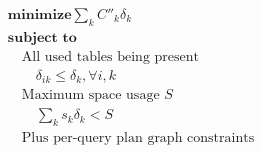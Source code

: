 \documentclass[preview,border=2pt]{standalone}
\begin{document}
\[
\renewcommand{\arraystretch}{1.2}
\begin{array}{l}
\displaystyle \textbf{minimize} \sum_k C''_k \delta_k \\
\textbf{subject to} \\
\quad \text{All used tables being present} \\
\qquad \delta_{ik} \leq \delta_k, \forall{i, k} \\
\quad \text{Maximum space usage } S \\
\displaystyle \qquad \sum_k s_k \delta_k < S \\
\quad \text{Plus per-query plan graph constraints}
\end{array}
\]
\end{document}
